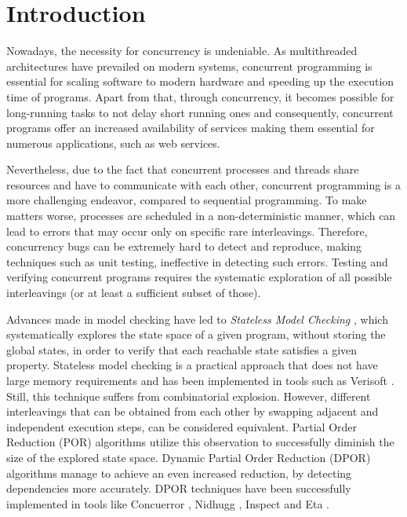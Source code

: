  \chapter{Introduction}

Nowadays, the necessity for concurrency is undeniable. 
As multithreaded architectures have prevailed on modern systems, concurrent 
programming is essential for scaling software to modern hardware and speeding up the execution time of programs. Apart from that, through concurrency, it becomes possible for 
long-running tasks to not delay short running ones and consequently, concurrent programs offer an increased availability 
of services making them essential for numerous applications, such as web services. 

Nevertheless, due to the fact that concurrent processes and threads share resources and have to communicate with each other,
concurrent programming is a more challenging endeavor, compared to sequential programming. To make matters worse, 
processes are scheduled in a non-deterministic manner, which can lead to errors that may occur only on specific 
rare interleavings. Therefore, concurrency bugs can be extremely hard to detect and reproduce, making techniques such as
unit testing, ineffective in detecting such errors. Testing and verifying concurrent programs requires the systematic exploration
of all possible interleavings (or at least a sufficient subset of those).

Advances made in model checking have led to \textit{Stateless Model Checking} \cite{Godefroid:1997:MCP:263699.263717}, 
which systematically explores the state space of a given program, without storing the global states, in order to verify
that each reachable state satisfies a given property.
Stateless model checking is a practical approach that does not have large memory requirements and has been implemented in
tools such as Verisoft \cite{Godefroid:2005:SMC:1084665.1084674}.
Still, this technique suffers from combinatorial explosion. However, different interleavings that can be obtained from each other by
swapping adjacent and independent execution steps, can be considered equivalent.
Partial Order Reduction (POR) \cite{Godefroid1996, POR, 10.1007/3-540-53863-1_36} algorithms utilize this observation to successfully diminish
the size of the explored state space. Dynamic Partial Order Reduction 
(DPOR) \cite{FlanaganDPOR, AbdullaAronisJohnssonSagonasDPOR2014} algorithms manage to achieve an even increased reduction,
by detecting dependencies more accurately. DPOR techniques have been successfully implemented in tools like Concuerror 
\cite{6569727, Gotovos:2011:TDC:2034654.2034664}, Nidhugg \cite{Abdulla:2015:SMC:2945565.2945622}, Inspect \cite{Yang:2007:DDP:1770532.1770541}
and Eta \cite{simsa2011efficient}.

